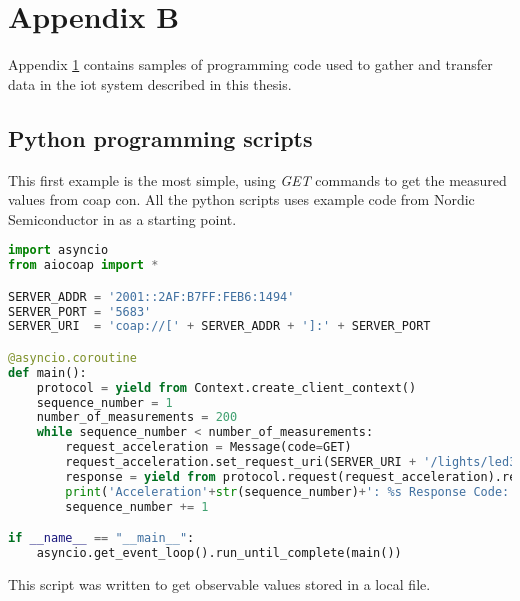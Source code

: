 \chapter{Appendix B}
\label{chp:appendix}

Appendix \ref{chp:appendix} contains samples of programming code used to gather and transfer data in the \gls{iot} system described in this thesis. 

\section{Python programming scripts}

This first example is the most simple, using \textit{GET} commands to get the measured values from \gls{coap} \gls{con}. All the python scripts uses example code from Nordic Semiconductor in \cite{nordicServerExamplePython2} as a starting point. 

\begin{lstlisting}[language=Python]
import asyncio
from aiocoap import *

SERVER_ADDR = '2001::2AF:B7FF:FEB6:1494'
SERVER_PORT = '5683'
SERVER_URI  = 'coap://[' + SERVER_ADDR + ']:' + SERVER_PORT

@asyncio.coroutine
def main():
	protocol = yield from Context.create_client_context()
	sequence_number = 1
	number_of_measurements = 200
	while sequence_number < number_of_measurements:
		request_acceleration = Message(code=GET)
		request_acceleration.set_request_uri(SERVER_URI + '/lights/led3')
		response = yield from protocol.request(request_acceleration).response
		print('Acceleration'+str(sequence_number)+': %s Response Code: %s\n'%(response.payload, response.code))		
		sequence_number += 1

if __name__ == "__main__":
	asyncio.get_event_loop().run_until_complete(main())

\end{lstlisting}

\newpage

This script was written to get observable values stored in a local file. 

